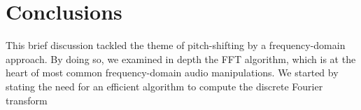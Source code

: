 \documentclass[class=article,crop=false]{standalone}
\begin{document}
	\section{Conclusions}
	This brief discussion tackled the theme of pitch-shifting by a frequency-domain approach. By doing so, we examined in depth the FFT algorithm, which is at the heart of most common frequency-domain audio manipulations. We started by stating the need for an efficient algorithm to compute the discrete Fourier transform
\end{document}
